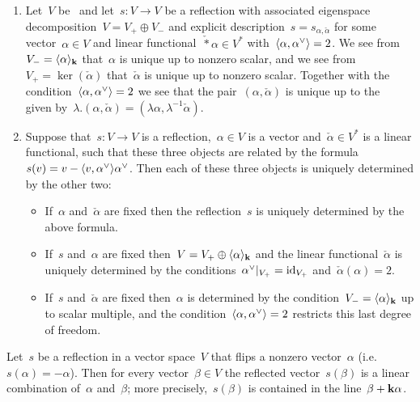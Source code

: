 \begin{remark}
  \label{regarding general reflections}
  \leavevmode
  \begin{enumerate}
    \item
      \label{uniqueness of reflection parametrization}
      Let~$V$ be~{\vectorspace{$\kf$}} and let~$s \colon V \to V$ be a reflection with associated eigenspace decomposition~$V = V_+ \oplus V_-$ and explicit description~$s = s_{\alpha, \check{\alpha}}$ for some vector~$\alpha \in V$ and linear functional~$\check*{\alpha} \in V^*$ with~$\pair{\alpha, \check{\alpha}} = 2$.
      We see from~$V_- = \langle\alpha\rangle_{\mathbf{k}}$ that~$\alpha$ is unique up to nonzero scalar, and we see from~$V_+ = \ker(\check{\alpha})$ that~$\check{\alpha}$ is unique up to nonzero scalar.
      Together with the condition~$\pair{\alpha, \check{\alpha}} = 2$ we see that the pair~$(\alpha, \check{\alpha})$ is unique up to the~{\action{$\kf^{\times}$}} given by~$\lambda.(\alpha, \check{\alpha}) = (\lambda \alpha, \lambda^{-1} \check{\alpha})$.
    \item
      Suppose that~$s \colon V \to V$ is a reflection,~$\alpha \in V$ is a vector and~$\check{\alpha} \in V^*$ is a linear functional, such that these three objects are related by the formula~$s(v) = v - \pair{v, \check{\alpha}} \check{\alpha}$.
      Then each of these three objects is uniquely determined by the other two:
      \begin{itemize}
        \item
          If~$\alpha$ and~$\check{\alpha}$ are fixed then the reflection~$s$ is uniquely determined by the above formula.
        \item
          If~$s$ and~$\alpha$ are fixed then~$V = V_+ \oplus \langle\alpha\rangle_{\mathbf{k}}$ and the linear functional~$\check{\alpha}$ is uniquely determined by the conditions~$\restrict{\check{\alpha}}{V_+} = \id_{V_+}$ and~$\check{\alpha}(\alpha) = 2$.
        \item
          If~$s$ and~$\check{\alpha}$ are fixed then~$\alpha$ is determined by the condition~$V_- = \langle\alpha\rangle_{\mathbf{k}}$ up to scalar multiple, and the condition~$\pair{\alpha, \check{\alpha}} = 2$ restricts this last degree of freedom.
      \end{itemize}
  \end{enumerate}
\end{remark}


\begin{corollary}
  \label{reflected vector is a linear combination}
  Let~$s$ be a reflection in a vector space~$V$ that flips a nonzero vector~$\alpha$ (i.e.~$s(\alpha) = -\alpha$).
  Then for every vector~$\beta \in V$ the reflected vector~$s(\beta)$ is a linear combination of~$\alpha$ and~$\beta$;
  more precisely,~$s(\beta)$ is contained in the line~$\beta + \mathbf{k} \alpha$.
\end{corollary}


